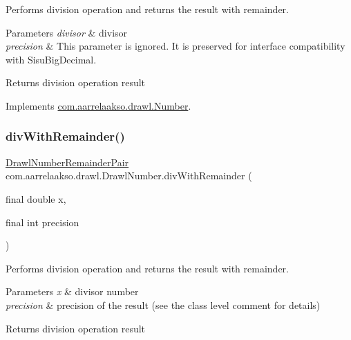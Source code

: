 Performs division operation and returns the result with remainder. 


\begin{DoxyParams}{Parameters}
{\em divisor} & divisor \\
\hline
{\em precision} & This parameter is ignored. It is preserved for interface compatibility with Sisu\+Big\+Decimal. \\
\hline
\end{DoxyParams}
\begin{DoxyReturn}{Returns}
division operation result 
\end{DoxyReturn}


Implements \hyperlink{interfacecom_1_1aarrelaakso_1_1drawl_1_1_number_abf7f5f2ea47601b2dbf399c68e4bf895}{com.\+aarrelaakso.\+drawl.\+Number}.

\mbox{\label{classcom_1_1aarrelaakso_1_1drawl_1_1_drawl_number_a6dc7cefb2574b9675ab3bc099760cbd2}} 
\subsubsection{\texorpdfstring{div\+With\+Remainder()}{divWithRemainder()}\hspace{0.1cm}{\footnotesize\ttfamily [2/2]}}
{\footnotesize\ttfamily \hyperlink{classcom_1_1aarrelaakso_1_1drawl_1_1_drawl_number_remainder_pair}{Drawl\+Number\+Remainder\+Pair} com.\+aarrelaakso.\+drawl.\+Drawl\+Number.\+div\+With\+Remainder (\begin{DoxyParamCaption}\item[{final double}]{x,  }\item[{final int}]{precision }\end{DoxyParamCaption})}



Performs division operation and returns the result with remainder. 


\begin{DoxyParams}{Parameters}
{\em x} & divisor number \\
\hline
{\em precision} & precision of the result (see the class level comment for details) \\
\hline
\end{DoxyParams}
\begin{DoxyReturn}{Returns}
division operation result 
\end{DoxyReturn}


